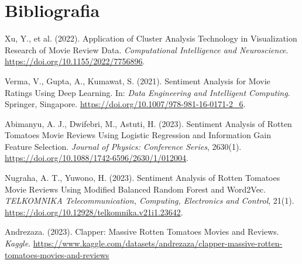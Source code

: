 \documentclass[a4paper,12pt]{article}
\begin{document}
\section{Bibliografia}
\begin{thebibliography}{9}

 Xu, Y., et al. (2022). Application of Cluster Analysis Technology in Visualization Research of Movie Review Data. \textit{Computational Intelligence and Neuroscience}. \url{https://doi.org/10.1155/2022/7756896}.

 Verma, V., Gupta, A., Kumawat, S. (2021). Sentiment Analysis for Movie Ratings Using Deep Learning. In: \textit{Data Engineering and Intelligent Computing}. Springer, Singapore. \url{https://doi.org/10.1007/978-981-16-0171-2_6}.

 Abimanyu, A. J., Dwifebri, M., Astuti, H. (2023). Sentiment Analysis of Rotten Tomatoes Movie Reviews Using Logistic Regression and Information Gain Feature Selection. \textit{Journal of Physics: Conference Series}, 2630(1). \url{https://doi.org/10.1088/1742-6596/2630/1/012004}.

 Nugraha, A. T., Yuwono, H. (2023). Sentiment Analysis of Rotten Tomatoes Movie Reviews Using Modified Balanced Random Forest and Word2Vec. \textit{TELKOMNIKA Telecommunication, Computing, Electronics and Control}, 21(1). \url{https://doi.org/10.12928/telkomnika.v21i1.23642}.

 Andrezaza. (2023). Clapper: Massive Rotten Tomatoes Movies and Reviews. \textit{Kaggle}. \url{https://www.kaggle.com/datasets/andrezaza/clapper-massive-rotten-tomatoes-movies-and-reviews}

\end{thebibliography}
\end{document}
